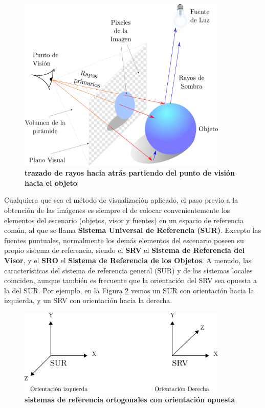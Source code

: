  \begin{figure}[h]
    \includegraphics[width=10cm]{Img/GEO/geo-ojo1.png}
    \centering
    \caption{\textbf{\footnotesize{trazado de rayos hacia atrás partiendo del punto de visión hacia el objeto}}}
    \label{fig:ojo}
    \end{figure}
    
Cualquiera que sea el método de visualización aplicado, el paso previo a la obtención de las imágenes es siempre el de colocar convenientemente los elementos del escenario (objetos, visor y fuentes) en un espacio de referencia
común, al que se llama \textbf{Sistema Universal de Referencia} \textbf{(SUR)}. Excepto las fuentes puntuales, normalmente los demás elementos del escenario poseen su propio sistema de referencia, siendo el \textbf{SRV} el \textbf{Sistema de Referencia del Visor}, y el \textbf{SRO} el \textbf{Sistema de Referencia de los Objetos}.
A menudo, las características del sistema de referencia general (SUR) y de los sistemas locales coinciden, aunque también es frecuente que la orientación del SRV sea opuesta a la del SUR. Por ejemplo, en la Figura \ref{fig:grafica8} vemos un SUR con orientación hacia la izquierda, y un SRV con orientación hacia la derecha.

 \begin{figure}[h]
    \includegraphics[width=10cm]{Img/CPD/grafica8.png}
    \centering
    \caption{\textbf{\footnotesize{ sistemas de referencia ortogonales con orientación opuesta }}}
    \label{fig:grafica8}
    \end{figure}
    

